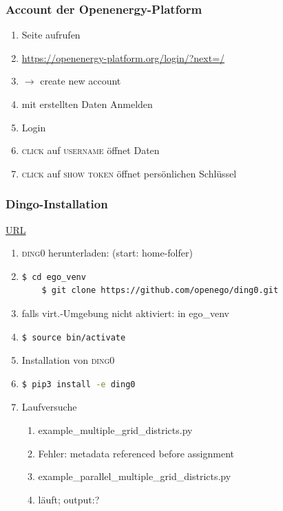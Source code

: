 \documentclass[
a4paper,     %
12pt         %
]{scrartcl}  %
\begin{document}
\subsubsection{Account der Openenergy-Platform}
\label{acc-oedb}
\begin{enumerate}
	\item Seite aufrufen
	\item[] \url{https://openenergy-platform.org/login/?next=/}
	\item $\rightarrow$ create new account
	\item mit erstellten Daten Anmelden
	\item Login
	\item \textsc{click} auf \textsc{username} öffnet Daten
	\item \textsc{click} auf \textsc{show token} öffnet persönlichen Schlüssel
\end{enumerate}

\subsubsection{Dingo-Installation}
\url{URL}
\begin{enumerate}
	\item \textsc{ding0} herunterladen: (start: home-folfer)
	\item[] \begin{lstlisting}[language=bash]
	$ cd ego_venv
	$ git clone https://github.com/openego/ding0.git
	\end{lstlisting}
	\item[] falls virt.-Umgebung nicht aktiviert: in \glqq ego\_venv \grqq
	\item[] \begin{lstlisting}[language=bash]
	$ source bin/activate
	\end{lstlisting}

	\item Installation von \textsc{ding0}
	\item[] \begin{lstlisting}[language=bash]
	$ pip3 install -e ding0
	\end{lstlisting}

	\item Laufversuche
	\begin{enumerate}
		\item example\_multiple\_grid\_districts.py
		\item[] Fehler: metadata referenced before assignment
		\item  example\_parallel\_multiple\_grid\_districts.py
		\item[] läuft; output:?
	\end{enumerate}
\end{enumerate}
\end{document}
